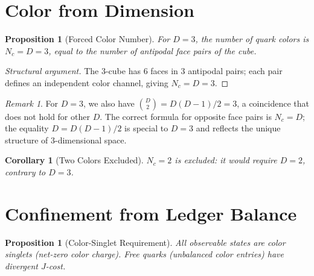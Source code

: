 \documentclass[12pt,a4paper]{article}
\newtheorem{corollary}[theorem]{Corollary}
\newtheorem{proposition}[theorem]{Proposition}
\theoremstyle{definition}
\theoremstyle{remark}
\newtheorem{remark}[theorem]{Remark}
\begin{document}
\section{Color from Dimension}
\label{sec:color}

\begin{proposition}[Forced Color Number]
\label{thm:nc}
For $D = 3$, the number of quark colors is $N_c = D = 3$, equal to the
number of antipodal face pairs of the cube.
\end{proposition}

\begin{proof}[Structural argument]
The 3-cube has 6 faces in 3 antipodal pairs; each pair defines an
independent color channel, giving $N_c = D = 3$.
\end{proof}

\begin{remark}
For $D = 3$, we also have $\binom{D}{2} = D(D-1)/2 = 3$, a coincidence
that does not hold for other $D$.  The correct formula for opposite
face pairs is $N_c = D$; the equality $D = D(D-1)/2$ is special to
$D = 3$ and reflects the unique structure of 3-dimensional space.
\end{remark}

\begin{corollary}[Two Colors Excluded]
\label{thm:nc2}
$N_c = 2$ is excluded: it would require $D = 2$, contrary to $D = 3$.
\end{corollary}

\section{Confinement from Ledger Balance}
\label{sec:confinement}

\begin{proposition}[Color-Singlet Requirement]
\label{thm:singlet}
All observable states are color singlets (net-zero color charge).
Free quarks (unbalanced color entries) have divergent $J$-cost.
\end{proposition}
\end{document}
